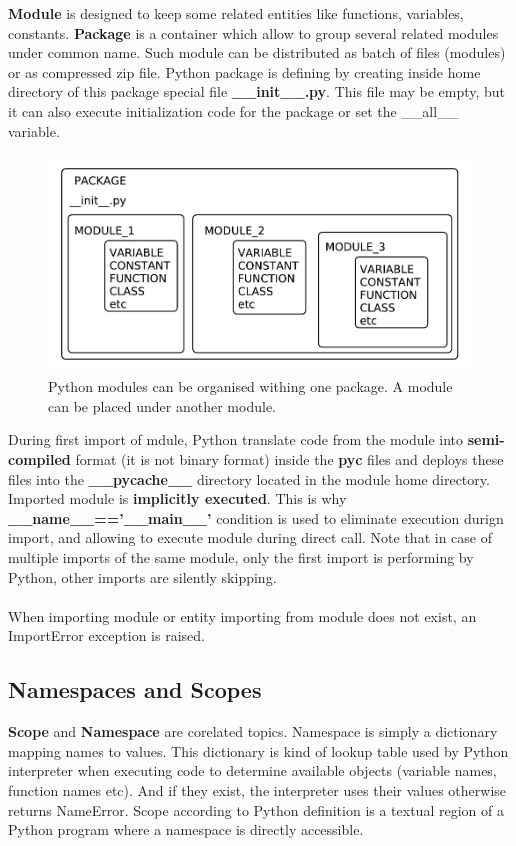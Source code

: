 \documentclass{article}
\begin{document}
\textbf{Module} is designed to keep some related entities like functions, variables, constants. \textbf{Package} is a container which allow to group several related modules under common name. Such module can be distributed as batch of files (modules) or as compressed zip file. Python package is defining by creating inside home directory of this package special file \textbf{\_\_init\_\_.py}. This file may be empty, but it can also execute initialization code for the package or set the \_\_all\_\_ variable.
\begin{figure}[!htbp]
\centering
\includegraphics[scale=0.7]{pi_package_module_entity.pdf}
\caption{\label{fig:label}Python modules can be organised withing one package. A module can be placed under another module.}
\end{figure}
During first import of mdule, Python translate code from the module into \textbf{semi-compiled} format (it is not binary format) inside the \textbf{pyc} files and deploys these files into the \textbf{\_\_pycache\_\_} directory located in the module home directory. Imported module is \textbf{implicitly executed}. This is why \textbf{\_\_name\_\_=='\_\_main\_\_'} condition is used to eliminate execution durign import, and allowing to execute module during direct call. Note that in case of multiple imports of the same module, only the first import is performing by Python, other imports are silently skipping.
\paragraph{}
When importing module or entity importing from module does not exist, an \textcolor{pythonerror}{ImportError} exception is raised.

\subsection{Namespaces and Scopes}
\textbf{Scope} and \textbf{Namespace} are corelated topics. Namespace is simply a dictionary mapping names to values. This dictionary is kind of lookup table used by Python interpreter when executing code to determine available objects (variable names, function names etc). And if they exist, the interpreter uses their values otherwise returns \textcolor{pythonerror}{NameError}. Scope according to Python definition is a textual region of a Python program where a namespace is directly accessible.
\end{document}
